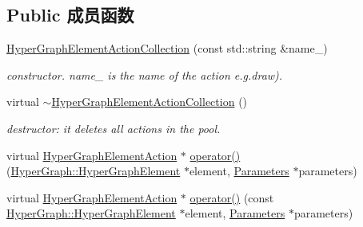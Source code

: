 \subsection*{Public 成员函数}
\begin{DoxyCompactItemize}
\item 
\hypertarget{classg2o_1_1HyperGraphElementActionCollection_a6af1ca2dfcdc0894eb594c68135dd614}{\hyperlink{classg2o_1_1HyperGraphElementActionCollection_a6af1ca2dfcdc0894eb594c68135dd614}{Hyper\-Graph\-Element\-Action\-Collection} (const std\-::string \&name\-\_\-)}\label{classg2o_1_1HyperGraphElementActionCollection_a6af1ca2dfcdc0894eb594c68135dd614}

\begin{DoxyCompactList}\small\item\em constructor. name\-\_\- is the name of the action e.\-g.\-draw). \end{DoxyCompactList}\item 
\hypertarget{classg2o_1_1HyperGraphElementActionCollection_ad55fc899922f91c1446d9d69f343c7ab}{virtual \hyperlink{classg2o_1_1HyperGraphElementActionCollection_ad55fc899922f91c1446d9d69f343c7ab}{$\sim$\-Hyper\-Graph\-Element\-Action\-Collection} ()}\label{classg2o_1_1HyperGraphElementActionCollection_ad55fc899922f91c1446d9d69f343c7ab}

\begin{DoxyCompactList}\small\item\em destructor\-: it deletes all actions in the pool. \end{DoxyCompactList}\item 
virtual \hyperlink{classg2o_1_1HyperGraphElementAction}{Hyper\-Graph\-Element\-Action} $\ast$ \hyperlink{classg2o_1_1HyperGraphElementActionCollection_a1388f0d6629501c1b80035f80c56efbe}{operator()} (\hyperlink{structg2o_1_1HyperGraph_1_1HyperGraphElement}{Hyper\-Graph\-::\-Hyper\-Graph\-Element} $\ast$element, \hyperlink{structg2o_1_1HyperGraphElementAction_1_1Parameters}{Parameters} $\ast$parameters)
\item 
\hypertarget{classg2o_1_1HyperGraphElementActionCollection_a4cb9b20a8b1aac8eb018ef6fc4ec0dfc}{virtual \hyperlink{classg2o_1_1HyperGraphElementAction}{Hyper\-Graph\-Element\-Action} $\ast$ \hyperlink{classg2o_1_1HyperGraphElementActionCollection_a4cb9b20a8b1aac8eb018ef6fc4ec0dfc}{operator()} (const \hyperlink{structg2o_1_1HyperGraph_1_1HyperGraphElement}{Hyper\-Graph\-::\-Hyper\-Graph\-Element} $\ast$element, \hyperlink{structg2o_1_1HyperGraphElementAction_1_1Parameters}{Parameters} $\ast$parameters)}\label{classg2o_1_1HyperGraphElementActionCollection_a4cb9b20a8b1aac8eb018ef6fc4ec0dfc}


\end{DoxyCompactItemize}
